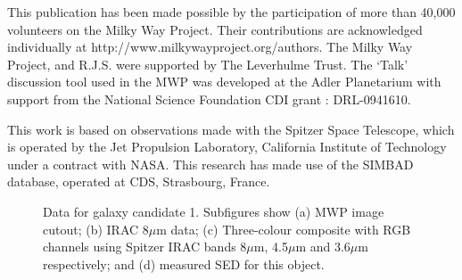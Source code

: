 \documentclass[times,usenatbib]{mn2e}
\begin{document}
This publication has been made possible by the participation of more than 40,000 volunteers on the Milky Way Project. Their contributions are acknowledged individually at http://www.milkywayproject.org/authors. The Milky Way Project, and R.J.S. were supported by The Leverhulme Trust. The `Talk' discussion tool used in the MWP was developed at the Adler Planetarium with support from the National Science Foundation CDI grant : DRL-0941610. 

This work is based on observations made with the Spitzer Space Telescope, which is operated by the Jet Propulsion Laboratory, California Institute of Technology under a contract with NASA. This research has made use of the SIMBAD database, operated at CDS, Strasbourg, France.




\clearpage


\begin{figure}
\begin{center}
\caption{Data for galaxy candidate 1. Subfigures show (a) MWP image cutout; (b) IRAC 8$\mu$m data; (c) Three-colour composite with RGB channels using Spitzer IRAC bands 8$\mu$m, 4.5$\mu$m and 3.6$\mu$m respectively; and (d) measured SED for this object.}
\label{gal1}
\end{center}
\end{figure} 
\end{document}
